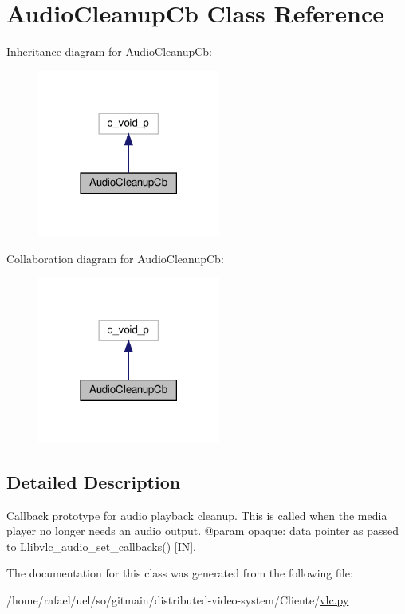 \hypertarget{classvlc_1_1_audio_cleanup_cb}{}\section{Audio\+Cleanup\+Cb Class Reference}
\label{classvlc_1_1_audio_cleanup_cb}


Inheritance diagram for Audio\+Cleanup\+Cb\+:
\nopagebreak
\begin{figure}[H]
\begin{center}
\leavevmode
\includegraphics[width=170pt]{classvlc_1_1_audio_cleanup_cb__inherit__graph}
\end{center}
\end{figure}


Collaboration diagram for Audio\+Cleanup\+Cb\+:
\nopagebreak
\begin{figure}[H]
\begin{center}
\leavevmode
\includegraphics[width=170pt]{classvlc_1_1_audio_cleanup_cb__coll__graph}
\end{center}
\end{figure}


\subsection{Detailed Description}
\begin{DoxyVerb}Callback prototype for audio playback cleanup.
This is called when the media player no longer needs an audio output.
@param opaque: data pointer as passed to L{libvlc_audio_set_callbacks}() [IN].
\end{DoxyVerb}
 

The documentation for this class was generated from the following file\+:\begin{DoxyCompactItemize}
\item 
/home/rafael/uel/so/gitmain/distributed-\/video-\/system/\+Cliente/\hyperlink{vlc_8py}{vlc.\+py}\end{DoxyCompactItemize}
